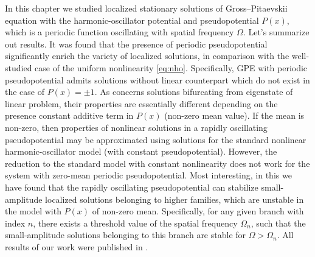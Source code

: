 In this chapter we studied localized stationary solutions of Gross--Pitaevskii equation with the harmonic-oscillator potential and pseudopotential $P(x)$, which is a periodic function oscillating with spatial frequency $\Omega$.
Let's summarize out results.
It was found that the presence of periodic pseudopotential significantly enrich the variety of localized solutions, in comparison with the well-studied case of the uniform nonlinearity \eqref{eq:nho}.
Specifically, GPE with periodic pseudopotential admits solutions without linear counterpart which do not exist in the case of $P(x) = \pm 1$.
As concerns solutions bifurcating from eigenstate of linear problem, their properties are essentially different depending on the presence constant additive term in $P(x)$ (non-zero mean value).
If the mean is non-zero, then properties of nonlinear solutions in a rapidly oscillating pseudopotential may be approximated using solutions for the standard nonlinear harmonic-oscillator model (with constant pseudopotential).
However, the reduction to the standard model with constant nonlinearity does not work for the system with zero-mean periodic pseudopotential.
Most interesting, in this we have found that the rapidly oscillating pseudopotential can stabilize small-amplitude localized solutions belonging to higher families, which are unstable in the model with $P(x)$ of non-zero mean.
Specifically, for any given branch with index $n$, there exists a threshold value of the spatial frequency $\Omega_n$, such that the small-amplitude solutions belonging to this branch are stable for $\Omega > \Omega_n$.
All results of our work were published in \cite{AlfimovGegelLebedevMalomedZezyulin}.
